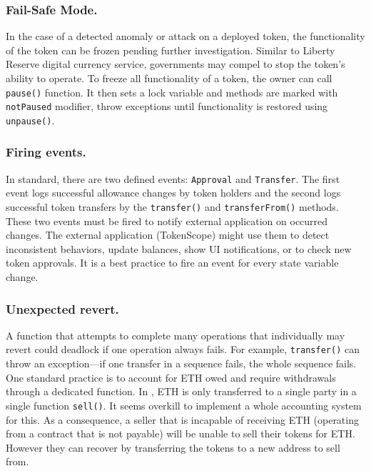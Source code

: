 \subsubsection{Fail-Safe Mode.}

In the case of a detected anomaly or attack on a deployed \erc token, the functionality of the token can be frozen pending further investigation. { \blue Similar to Liberty Reserve digital currency service\cite{LibertyReserve}, governments may compel to stop the token's ability to operate.} To freeze all functionality of a token, the owner can call \texttt{pause()} function. It then sets a lock variable and methods are marked with \texttt{notPaused} modifier, throw exceptions until functionality is restored using \texttt{unpause()}.


\subsubsection{Firing events.}

In \erc standard, there are two defined events: \texttt{Approval} and \texttt{Transfer}. The first event logs successful allowance changes by token holders and the second logs successful token transfers by the \texttt{transfer()} and \texttt{transferFrom()} methods. These two events must be fired to notify external application on occurred changes. The external application (\eg TokenScope\cite{TokenScope}) might use them to detect inconsistent behaviors, update balances, show UI notifications, or to check new token approvals. It is a best practice to fire an event for every state variable change.

\subsubsection{Unexpected revert.}

A function that attempts to complete many operations that individually may revert could deadlock if one operation always fails. For example, \texttt{transfer()} can throw an exception---if one transfer in a sequence fails, the whole sequence fails. One standard practice is to account for ETH owed and require withdrawals through a dedicated function. In \sys, ETH is only transferred to a single party in a single function \texttt{sell()}. It seems overkill to implement a whole accounting system for this. As a consequence, a seller that is incapable of receiving ETH (\eg operating from a contract that is not payable) will be unable to sell their tokens for ETH. However they can recover by transferring the tokens to a new address to sell from. 

